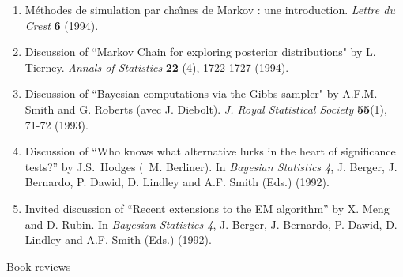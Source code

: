 \begin{enumerate}
\item M\'ethodes de simulation par cha\^\i nes de Markov : une
introduction. {\it Lettre du Crest} {\bf 6} (1994).

\item Discussion of ``Markov Chain for exploring posterior distributions" 
by L. Tierney. {\it Annals of Statistics} {\bf 22} (4), 1722-1727 (1994).

\item Discussion of ``Bayesian computations via the Gibbs
sampler" by A.F.M. Smith and G. Roberts (avec J. Die\-bolt). {\it 
J. Royal Statistical Society} {\bf 55}(1), 71-72 (1993).

\item Discussion of ``Who knows what alternative lurks in the 
heart of significance tests?'' by J.S.\ Hodges (\avec\  M. Berliner).
In {\it Bayesian Statistics 4}, J. Berger, J. Bernardo,
P. Dawid, D. Lindley and A.F. Smith (Eds.) (1992).

\item Invited discussion of ``Recent extensions to the 
EM algorithm'' by X. Meng and D.
Rubin. In {\it Bayesian Statistics 4}, J. Berger, J. Bernardo,
P. Dawid, D. Lindley and A.F. Smith (Eds.) (1992).

\end{enumerate}

\bigskip
		\centerline{\sc Book reviews}

